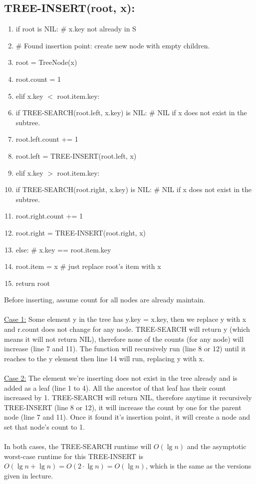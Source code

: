 \documentclass{article}
\begin{document}
\subsection*{TREE-INSERT(root, x):}
\begin{enumerate}[itemsep=0pt,parsep=0pt]
    \item if root is NIL:  \quad\# x.key not already in S
    \item \qquad \# Found insertion point: create new node with empty children.
    \item \qquad root = TreeNode(x)
    \item \qquad root.count = 1
    \item elif x.key $<$ root.item.key:
    \item \qquad if TREE-SEARCH(root.left, x.key) is NIL: \quad\# NIL if x does not exist in the subtree.
    \item \qquad \qquad root.left.count += 1
    \item \qquad root.left = TREE-INSERT(root.left, x)
    \item elif x.key $>$ root.item.key:
    \item \qquad if TREE-SEARCH(root.right, x.key) is NIL: \quad\# NIL if x does not exist in the subtree.
    \item \qquad \qquad root.right.count += 1
    \item \qquad root.right = TREE-INSERT(root.right, x)
    \item else:  \quad\# x.key == root.item.key
    \item \qquad root.item = x  \quad\# just replace root's item with x
    \item return root
\end{enumerate}
Before inserting, assume count for all nodes are already maintain.\\~\\
\underline{Case 1:} Some element y in the tree has y.key = x.key, then we replace y with x and r.count does not change for any node. TREE-SEARCH will return y (which means it will not return NIL), therefore none of the counts (for any node) will increase (line 7 and 11). The function will recursively run (line 8 or 12) until it reaches to the y element then line 14 will run, replacing y with x.\\~\\
\underline{Case 2:} The element we're inserting does not exist in the tree already and is added as a leaf (line 1 to 4). All the ancestor of that leaf has their count increased by 1. TREE-SEARCH will return NIL, therefore anytime it recursively TREE-INSERT (line 8 or 12), it will increase the count by one for the parent node (line 7 and 11). Once it found it's insertion point, it will create a node and set that node's count to 1. \\~\\
In both cases, the TREE-SEARCH runtime will $O(\lg n)$ and the asymptotic worst-case runtime for this TREE-INSERT is $O(\lg n + \lg n) = O(2\cdot\lg n) = O(\lg n)$, which is the same as the versions given in lecture.
\end{document}
